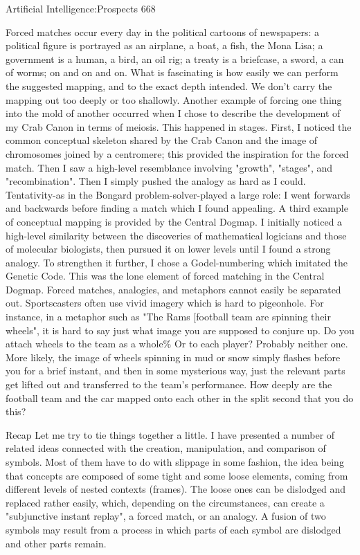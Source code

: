 Artificial Intelligence:Prospects                                                       668

         Forced matches occur every day in the political cartoons of newspapers: a
political figure is portrayed as an airplane, a boat, a fish, the Mona Lisa; a government is
a human, a bird, an oil rig; a treaty is a briefcase, a sword, a can of worms; on and on and
on. What is fascinating is how easily we can perform the suggested mapping, and to the
exact depth intended. We don't carry the mapping out too deeply or too shallowly.
         Another example of forcing one thing into the mold of another occurred when I
chose to describe the development of my Crab Canon in terms of meiosis. This happened
in stages. First, I noticed the common conceptual skeleton shared by the Crab Canon and
the image of chromosomes joined by a centromere; this provided the inspiration for the
forced match. Then I saw a high-level resemblance involving "growth", "stages", and
"recombination". Then I simply pushed the analogy as hard as I could. Tentativity-as in
the Bongard problem-solver-played a large role: I went forwards and backwards before
finding a match which I found appealing.
         A third example of conceptual mapping is provided by the Central Dogmap. I
initially noticed a high-level similarity between the discoveries of mathematical logicians
and those of molecular biologists, then pursued it on lower levels until I found a strong
analogy. To strengthen it further, I chose a Godel-numbering which imitated the Genetic
Code. This was the lone element of forced matching in the Central Dogmap.
         Forced matches, analogies, and metaphors cannot easily be separated out.
Sportscasters often use vivid imagery which is hard to pigeonhole. For instance, in a
metaphor such as "The Rams [football team are spinning their wheels", it is hard to say
just what image you are supposed to conjure up. Do you attach wheels to the team as a
whole\% Or to each player? Probably neither one. More likely, the image of wheels
spinning in mud or snow simply flashes before you for a brief instant, and then in some
mysterious way, just the relevant parts get lifted out and transferred to the team's
performance. How deeply are the football team and the car mapped onto each other in the
split second that you do this?

                                          Recap
Let me try to tie things together a little. I have presented a number of related ideas
connected with the creation, manipulation, and comparison of symbols. Most of them
have to do with slippage in some fashion, the idea being that concepts are composed of
some tight and some loose elements, coming from different levels of nested contexts
(frames). The loose ones can be dislodged and replaced rather easily, which, depending
on the circumstances, can create a "subjunctive instant replay", a forced match, or an
analogy. A fusion of two symbols may result from a process in which parts of each
symbol are dislodged and other parts remain.




